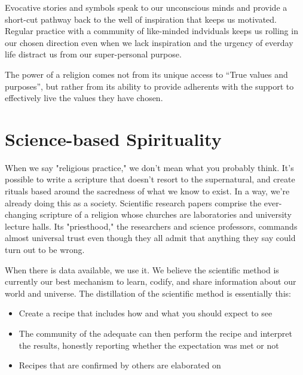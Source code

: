 \documentclass[ebook,12pt,openany,twoside]{memoir}
\begin{document}
Evocative stories and symbols speak to our unconscious minds and provide a
short-cut pathway back to the well of inspiration that keeps us motivated.
Regular practice with a community of like-minded indviduals keeps us rolling in
our chosen direction even when we lack inspiration and the urgency of everday
life distract us from our super-personal purpose.

The power of a religion comes not from its unique access to ``True values and
purposes'', but rather from its ability to provide adherents with the support to
effectively live the values they have chosen.

\chapter{Science-based Spirituality}

When we say "religious practice," we don't mean what you probably think. It's
possible to write a scripture that doesn't resort to the supernatural, and
create rituals based around the sacredness of what we know to exist. In a way,
we're already doing this as a society. Scientific research papers comprise the
ever-changing scripture of a religion whose churches are laboratories and
university lecture halls. Its "priesthood," the researchers and science
professors, commands almost universal trust even though they all admit that
anything they say could turn out to be wrong.

When there is data available, we use it. We believe the scientific method is
currently our best mechanism to learn, codify, and share information about our
world and universe. The distillation of the scientific method is essentially
this:
\begin{itemize}[\textbullet]
\item Create a recipe that includes how and what you should expect to see

\item The community of the adequate can then perform the recipe and interpret
the results, honestly reporting whether the expectation was met or not

\item Recipes that are confirmed by others are elaborated on
\end{itemize}
\end{document}
